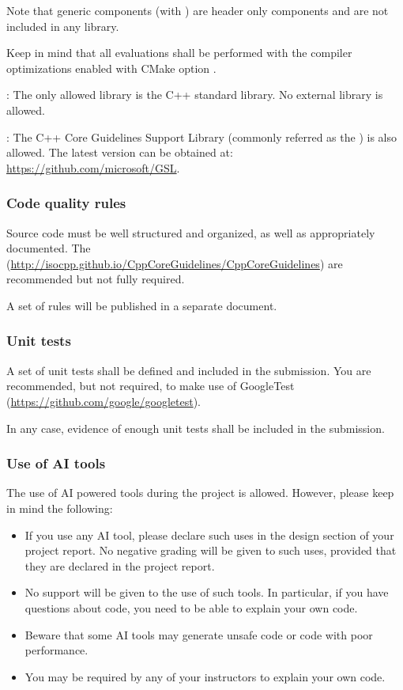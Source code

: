 Note that generic components (with ) are header only components and
are not included in any library.

Keep in mind that all evaluations shall be performed with the compiler optimizations
enabled with CMake option
.

: 
The only allowed library is the C++ standard library.
No external library is allowed.

: The C++ Core Guidelines Support Library (commonly referred as
the ) is also allowed. The latest version can be obtained at:
\url{https://github.com/microsoft/GSL}.

\subsubsection{Code quality rules}

Source code must be well structured and organized, 
as well as appropriately documented.
The 
(\url{http://isocpp.github.io/CppCoreGuidelines/CppCoreGuidelines})
are recommended but not fully required.

A set of rules will be published in a separate document.

\subsubsection{Unit tests}

A set of unit tests shall be defined and included in the submission.
You are recommended, but not required, to make use of GoogleTest
(\url{https://github.com/google/googletest}).

In any case, evidence of enough unit tests shall be included in the
submission.

\subsubsection{Use of AI tools}

The use of AI powered tools during the project is allowed. However, please
keep in mind the following:

\begin{itemize}

\item If you use any AI tool, please declare such uses in the design section
of your project report. No negative grading will be given to such uses, provided
that they are declared in the project report.

\item No support will be given to the use of such tools. In particular, if you
have questions about code, you need to be able to explain your own code.

\item Beware that some AI tools may generate unsafe code or code with poor 
performance.

\item You may be required by any of your instructors to explain your own code.


\end{itemize}

